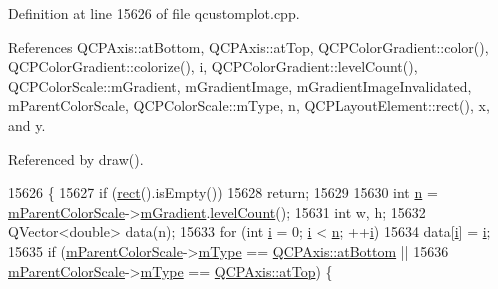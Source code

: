 Definition at line 15626 of file qcustomplot.\+cpp.



References Q\+C\+P\+Axis\+::at\+Bottom, Q\+C\+P\+Axis\+::at\+Top, Q\+C\+P\+Color\+Gradient\+::color(), Q\+C\+P\+Color\+Gradient\+::colorize(), i, Q\+C\+P\+Color\+Gradient\+::level\+Count(), Q\+C\+P\+Color\+Scale\+::m\+Gradient, m\+Gradient\+Image, m\+Gradient\+Image\+Invalidated, m\+Parent\+Color\+Scale, Q\+C\+P\+Color\+Scale\+::m\+Type, n, Q\+C\+P\+Layout\+Element\+::rect(), x, and y.



Referenced by draw().


\begin{DoxyCode}
15626                                                        \{
15627   \textcolor{keywordflow}{if} (\hyperlink{class_q_c_p_layout_element_affdfea003469aac3d0fac5f4e06171bc}{rect}().isEmpty())
15628     \textcolor{keywordflow}{return};
15629 
15630   \textcolor{keywordtype}{int} \hyperlink{_comparision_pictures_2_createtest_image_8m_aeab71244afb687f16d8c4f5ee9d6ef0e}{n} = \hyperlink{class_q_c_p_color_scale_axis_rect_private_a311c73f51a4cb0b556388197833cf099}{mParentColorScale}->\hyperlink{class_q_c_p_color_scale_ae195a385032066b5c46cc3301af58922}{mGradient}.\hyperlink{class_q_c_p_color_gradient_ae7537a8e6d0fed3f1928328062bb0f4e}{levelCount}();
15631   \textcolor{keywordtype}{int} w, h;
15632   QVector<double> data(n);
15633   \textcolor{keywordflow}{for} (\textcolor{keywordtype}{int} \hyperlink{_comparision_pictures_2_createtest_image_8m_a6f6ccfcf58b31cb6412107d9d5281426}{i} = 0; \hyperlink{_comparision_pictures_2_createtest_image_8m_a6f6ccfcf58b31cb6412107d9d5281426}{i} < \hyperlink{_comparision_pictures_2_createtest_image_8m_aeab71244afb687f16d8c4f5ee9d6ef0e}{n}; ++\hyperlink{_comparision_pictures_2_createtest_image_8m_a6f6ccfcf58b31cb6412107d9d5281426}{i})
15634     data[\hyperlink{_comparision_pictures_2_createtest_image_8m_a6f6ccfcf58b31cb6412107d9d5281426}{i}] = \hyperlink{_comparision_pictures_2_createtest_image_8m_a6f6ccfcf58b31cb6412107d9d5281426}{i};
15635   \textcolor{keywordflow}{if} (\hyperlink{class_q_c_p_color_scale_axis_rect_private_a311c73f51a4cb0b556388197833cf099}{mParentColorScale}->\hyperlink{class_q_c_p_color_scale_a7d47ed4ab76f38e50164e9d77fe33789}{mType} == \hyperlink{class_q_c_p_axis_ae2bcc1728b382f10f064612b368bc18aa220d68888516b6c3b493d144f1ba438f}{QCPAxis::atBottom} ||
15636       \hyperlink{class_q_c_p_color_scale_axis_rect_private_a311c73f51a4cb0b556388197833cf099}{mParentColorScale}->\hyperlink{class_q_c_p_color_scale_a7d47ed4ab76f38e50164e9d77fe33789}{mType} == \hyperlink{class_q_c_p_axis_ae2bcc1728b382f10f064612b368bc18aac0ece2b680d3f545e701f75af1655977}{QCPAxis::atTop}) \{

\end{DoxyCode}
